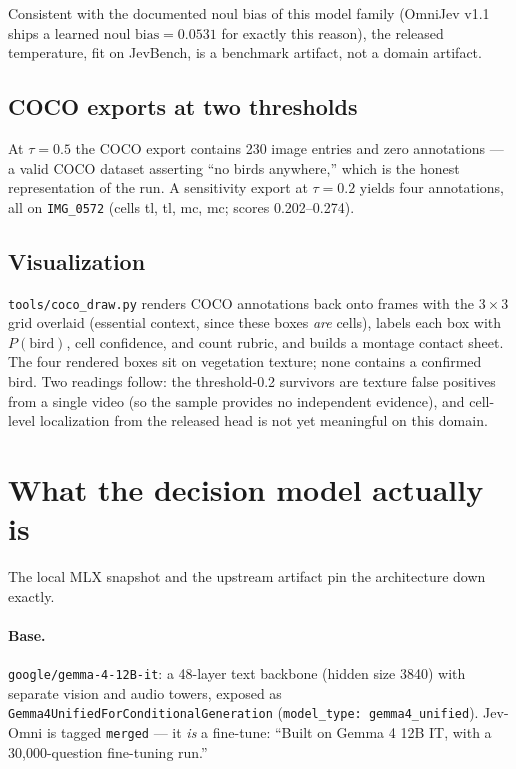 \documentclass[11pt]{article}
\newcommand{\code}[1]{\texttt{#1}}
\begin{document}
Consistent with the documented noul bias of this model family (OmniJev v1.1
ships a learned $\text{noul bias} = 0.0531$ for exactly this reason), the
released temperature, fit on JevBench, is a benchmark artifact, not a domain
artifact.

\subsection{COCO exports at two thresholds}

At $\tau = 0.5$ the COCO export contains 230 image entries and zero
annotations --- a valid COCO dataset asserting ``no birds anywhere,'' which is
the honest representation of the run. A sensitivity export at $\tau = 0.2$
yields four annotations, all on \code{IMG\_0572} (cells tl, tl, mc, mc; scores
0.202--0.274).

\subsection{Visualization}

\code{tools/coco\_draw.py} renders COCO annotations back onto frames with the
$3\times3$ grid overlaid (essential context, since these boxes \emph{are}
cells), labels each box with $P(\text{bird})$, cell confidence, and count
rubric, and builds a montage contact sheet. The four rendered boxes sit on
vegetation texture; none contains a confirmed bird. Two readings follow: the
threshold-0.2 survivors are texture false positives from a single video (so
the sample provides no independent evidence), and cell-level localization from
the released head is not yet meaningful on this domain.

\section{What the decision model actually is}
\label{sec:architecture}

The local MLX snapshot and the upstream artifact pin the architecture down
exactly.

\paragraph{Base.} \code{google/gemma-4-12B-it}: a 48-layer text backbone
(hidden size 3840) with separate vision and audio towers, exposed as
\code{Gemma4UnifiedForConditionalGeneration} (\code{model\_type:
gemma4\_unified}). Jev-Omni is tagged \code{merged} --- it \emph{is} a
fine-tune: ``Built on Gemma 4 12B IT, with a 30{,}000-question fine-tuning
run.''
\end{document}
